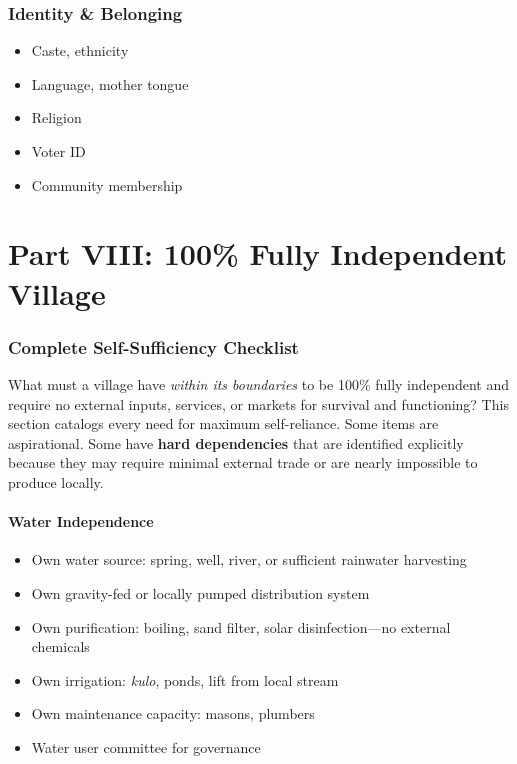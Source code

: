 \documentclass[11pt,a4paper]{article}
\begin{document}
\section{Identity \& Belonging}

\begin{itemize}
    \item Caste, ethnicity
    \item Language, mother tongue
    \item Religion
    \item Voter ID
    \item Community membership
\end{itemize}

\part{Part VIII: 100\% Fully Independent Village}

\section{Complete Self-Sufficiency Checklist}

What must a village have \textit{within its boundaries} to be 100\% fully independent and require no external inputs, 
services, or markets for survival and functioning? This section catalogs every need for maximum self-reliance. Some items 
are aspirational. Some have \textbf{hard dependencies} that are identified explicitly because 
they may require minimal external trade or are nearly impossible to produce locally.

\subsection{Water Independence}
\begin{itemize}
    \item Own water source: spring, well, river, or sufficient rainwater harvesting
    \item Own gravity-fed or locally pumped distribution system
    \item Own purification: boiling, sand filter, solar disinfection---no external chemicals
    \item Own irrigation: \textit{kulo}, ponds, lift from local stream
    \item Own maintenance capacity: masons, plumbers
    \item Water user committee for governance
\end{itemize}
\end{document}
